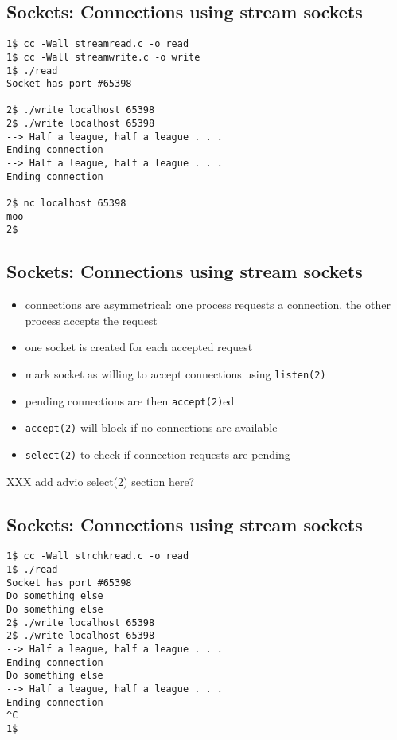 \documentclass[xga]{xdvislides}
\begin{document}
\subsection{Sockets: Connections using stream sockets}
\begin{verbatim}
1$ cc -Wall streamread.c -o read
1$ cc -Wall streamwrite.c -o write
1$ ./read
Socket has port #65398

2$ ./write localhost 65398
2$ ./write localhost 65398
--> Half a league, half a league . . .
Ending connection
--> Half a league, half a league . . .
Ending connection

2$ nc localhost 65398
moo
2$
\end{verbatim}
\vfill

\subsection{Sockets: Connections using stream sockets}
\begin{itemize}
	\item connections are asymmetrical:  one process requests a connection,
		the other process accepts the request
	\item one socket is created for each accepted request
	\item mark socket as willing to accept connections using {\tt listen(2)}
	\item pending connections are then {\tt accept(2)}ed
	\item {\tt accept(2)} will block if no connections are available
	\item {\tt select(2)} to check if connection requests are pending
\end{itemize}

XXX add advio select(2) section here?

\subsection{Sockets: Connections using stream sockets}
\begin{verbatim}
1$ cc -Wall strchkread.c -o read
1$ ./read
Socket has port #65398
Do something else
Do something else
2$ ./write localhost 65398
2$ ./write localhost 65398
‐-> Half a league, half a league . . .
Ending connection
Do something else
--> Half a league, half a league . . .
Ending connection
^C
1$
\end{verbatim}
\vfill
\end{document}

